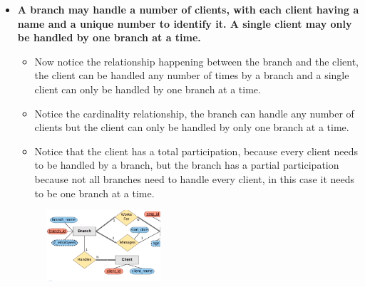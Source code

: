 \begin{itemize}
    \item \textbf{A branch may handle a number of clients, with each client having a name and a unique number to identify it. A single client may only be handled by one branch at a time.}
        \begin{itemize}
            \item Now notice the relationship happening between the branch and the client, the client can be handled any number of times by a branch and a single client can only be handled by one branch at a time.
            \item Notice the cardinality relationship, the branch can handle any number of clients but the client can only be handled by only one branch at a time.
            \item Notice that the client has a total participation, because every client needs to be handled by a branch, but the branch has a partial participation because not all branches need to handle every client, in this case it needs to be one branch at a time.
        \end{itemize}
        \begin{figure}[H]
            \centering
            \includegraphics[width=0.4\textwidth]{./Figs/2020-12-24-00-38-06.png}
        \end{figure}
    

\end{itemize}
